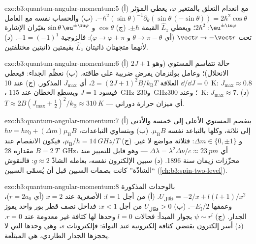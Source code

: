 \begin{solution}{exo:b3:quantum-angular-momentum:5}
(أ) مع انعدام التعلق بالمتغير $\varphi$، يعطي المؤثر
$-\hbar^2(\sin\theta)^{-1}\partial_\theta(\sin\theta\,(-\sin\theta))
= 2\hbar^2\cos\theta$. (ب) والحساب نفسه مع العامل
$\eu^{\pm\iu\varphi}$:  $2\hbar^2$؛ ويعطي $\hat L_z$
القيمة $\pm\hbar$. (ج) $\cos\theta$ و $\sin\theta\,\eu^{\pm\iu
\varphi}$ يغيّران الإشارة تحت $\vect r \to -\vect r$ (أي $\theta \to \pi
- \theta$ و $\varphi \to \varphi + \pi$): فالزوجية $-1 = (-1)^1$. (د)
لأنهما متجهتان ذاتيتان  $\hat L_z$ بقيمتين ذاتيتين
مختلفتين.
\end{solution}

\begin{solution}{exo:b3:quantum-angular-momentum:6}
(أ) $2J + 1$ حالة تتقاسم المستوي (وهو الانحلال)؛ وعامل
بولتزمان يفرض ضريبة على طاقته. (ب) نعظّم الجداء: فيعطي $\dd/\dd J = 0$
العلاقة $2 = (2J+1)^2B/k_{\text{B}}T$، أي $J_{\max}$ المذكور. (ج) عند
\qty{10}{K}: $J_{\max} \approx 0.8$، فيسود $J = 1$ ويسطع الخطان
عند \qty{115}{GHz} و\qty{230}{GHz}؛ وعند \qty{300}{K}:
$J_{\max} \approx 7$. (د) $T \approx 2B(J_{\max} + \tfrac12)^2/
k_{\text{B}} \approx \qty{310}{K}$ --- أي ميزان حرارة دوراني.
\end{solution}

\begin{solution}{exo:b3:quantum-angular-momentum:7}
(أ) ينفصم المستوي الأعلى إلى خمسة والأدنى إلى ثلاثة، وكلها
بالتباعد نفسه $\mu_{\text{B}}B$. (ب) وبتساوي التباعدات،
$h\nu = h\nu_0 + (\Delta m)\mu_{\text{B}}B$ و $\Delta m \in \{0,
\pm1\}$: فثلاثة مواضع لا غير. (ج) $\mu_{\text{B}}/h = \qty{14}{GHz/T}$، فيكون الانفصام عند $B = \qty{2}{T}$
مقداره \qty{28}{GHz}، أي $\Delta\lambda =
\lambda^2\Delta\nu/c \approx \qty{23}{pm}$ --- وهو قابل للتمييز منذ
محزّزات زيمان سنة 1896.
(د) سبين الإلكترون نفسه، بعامله الشاذّ $g \approx
2$: فالنقوش ``الشاذّة'' كانت بصمات السبين قبل أن يُسمّى
السبين (\cref{ch:b3:spin-two-level}).
\end{solution}

\begin{solution}{exo:b3:quantum-angular-momentum:8}
بالوحدات المذكورة $U_{\text{فعّال}} = -2/x + l(l+1)/x^2$. (أ) من أجل
$l = 1$: الأصغرية عند $x = 2$ (أي $r = 2a_0$)، وعمقها $-E_{\text{I}}/2$.
(ب) $U_{\text{فعّال}} > 0$ من أجل $x < 1$: فداخل نصف قطر بور واحد يفوز
الجدار. (ج) $\psi \sim r^l$ بجوار المبدأ: فحالات $l = 0$ وحدها لها
كثافة غير معدومة عند $r = 0$. (د) أسر إلكترون يقتضي
كثافة إلكترونية \emph{عند} النواة: فإلكترونات $s$، وهي وحدها
التي لا يحجزها الجدار الطاردي، هي المبتلَعة.
\end{solution}

